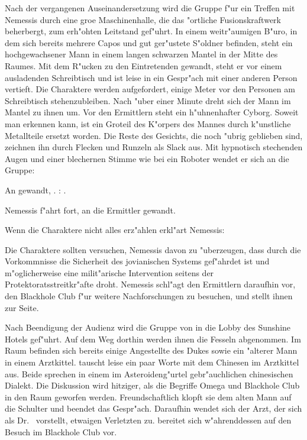
Nach der vergangenen Auseinandersetzung wird die Gruppe f"ur ein Treffen mit Nemessis durch eine gro\3e Maschinenhalle, die das "ortliche Fusionskraftwerk beherbergt, zum erh"ohten Leitstand gef"uhrt. In einem weitr"aumigen B"uro, in dem sich bereits mehrere Capos und gut ger"ustete S"oldner befinden, steht ein hochgewachsener Mann in einem langen schwarzen Mantel in der Mitte des Raumes. Mit dem R"ucken zu den Eintretenden gewandt, steht er vor einem ausladenden Schreibtisch und ist leise in ein Gespr"ach mit einer anderen Person vertieft. Die Charaktere werden aufgefordert, einige Meter vor den Personen am Schreibtisch stehenzubleiben. Nach "uber einer Minute dreht sich der Mann im Mantel zu ihnen um. Vor den Ermittlern steht ein h"uhnenhafter Cyborg. Soweit man erkennen kann, ist ein Gro\3teil des K"orpers des Mannes durch k"unstliche Metallteile ersetzt worden. Die Reste des Gesichts, die noch "ubrig geblieben sind, zeichnen ihn durch Flecken und Runzeln als Slack aus. Mit hypnotisch stechenden Augen und einer blechernen Stimme wie bei ein Roboter wendet er sich an die Gruppe:


An \xl{} gewandt, . \xl{}: . 

Nemessis f"ahrt fort, an die Ermittler gewandt.


Wenn die Charaktere nicht alles erz"ahlen erkl"art Nemessis:


Die Charaktere sollten versuchen, Nemessis davon zu "uberzeugen, dass durch die Vorkommnisse die Sicherheit des jovianischen Systems gef"ahrdet ist und m"oglicherweise eine milit"arische Intervention seitens der Protektoratsstreitkr"afte droht. Nemessis schl"agt den Ermittlern daraufhin vor, den Blackhole Club f"ur weitere Nachforschungen zu besuchen, und stellt ihnen \xl{} zur Seite.

Nach Beendigung der Audienz wird die Gruppe von \xl{} in die Lobby des Sunshine Hotels gef"uhrt. Auf dem Weg dorthin werden ihnen die Fesseln abgenommen. Im Raum befinden sich bereits einige Angestellte des Dukes sowie ein "alterer Mann in einem Arztkittel. \xl{} tauscht leise ein paar Worte mit dem Chinesen im Arztkittel aus. Beide sprechen in einem im Asteroideng"urtel gebr"auchlichen chinesischen Dialekt. Die Diskussion wird hitziger, als die Begriffe Omega und Blackhole Club in den Raum geworfen werden. Freundschaftlich klopft sie dem alten Mann auf die Schulter und beendet das Gespr"ach. Daraufhin wendet sich der Arzt, der sich als Dr.~  vorstellt, etwaigen Verletzten zu. \xl{} bereitet sich w"ahrenddessen auf den Besuch im Blackhole Club vor.

